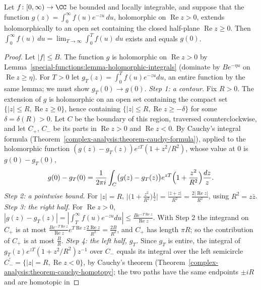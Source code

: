 \begin{theorem}\label{analytic-number-theory:theorem-newman}
Let $f \colon [0, \infty) \to \CC$ be bounded and locally integrable, and suppose that the function $g(z) = \int_0^\infty f(u)e^{-zu}\,du$, holomorphic on $\operatorname{Re}z > 0$, extends holomorphically
to an open set containing the closed half-plane $\operatorname{Re}z \geq 0$. Then $\int_0^\infty f(u)\,du = \lim_{T \to \infty}\int_0^Tf(u)\,du$ exists and equals $g(0)$.
\end{theorem}

\begin{proof}
Let $|f| \leq B$. The function $g$ is holomorphic on $\operatorname{Re}z > 0$ by Lemma~\ref{special-functions:lemma-holomorphic-integrals} (dominate by $Be^{-\eta u}$ on
$\operatorname{Re}z \geq \eta$). For $T > 0$ let $g_T(z) = \int_0^Tf(u)e^{-zu}du$, an entire function by the same lemma; we must show $g_T(0) \to g(0)$.
\emph{Step 1: a contour.} Fix $R > 0$. The extension of $g$ is holomorphic on an open set containing the compact set $\{|z| \leq R, \operatorname{Re}z \geq 0\}$, hence containing
$\{|z| \leq R, \operatorname{Re}z \geq -\delta\}$ for some $\delta = \delta(R) > 0$. Let $C$ be the boundary of this region, traversed counterclockwise, and let $C_+$, $C_-$ be its parts in
$\operatorname{Re}z > 0$ and $\operatorname{Re}z < 0$. By Cauchy's integral formula (Theorem~\ref{complex-analysis:theorem-cauchy-formula}), applied to the holomorphic function
$(g(z) - g_T(z))e^{zT}(1 + z^2/R^2)$, whose value at $0$ is $g(0) - g_T(0)$,
\[
g(0) - g_T(0) = \frac{1}{2\pi i}\int_C\bigl(g(z) - g_T(z)\bigr)e^{zT}\Bigl(1 + \frac{z^2}{R^2}\Bigr)\frac{dz}{z}.
\]
\emph{Step 2: a pointwise bound.} For $|z| = R$, $\bigl|\bigl(1 + \frac{z^2}{R^2}\bigr)\frac1z\bigr| = \frac{|\bar z + z|}{R^2} = \frac{2|\operatorname{Re}z|}{R^2}$, using $R^2 = z\bar z$.
\emph{Step 3: the right half.} For $\operatorname{Re}z > 0$, $|g(z) - g_T(z)| = |\int_T^\infty f(u)e^{-zu}du| \leq \frac{Be^{-T\operatorname{Re}z}}{\operatorname{Re}z}$. With Step 2 the integrand on $C_+$ is
at most $\frac{Be^{-T\operatorname{Re}z}}{\operatorname{Re}z}e^{T\operatorname{Re}z}\frac{2\operatorname{Re}z}{R^2} = \frac{2B}{R^2}$, and $C_+$ has length $\pi R$; so the contribution of $C_+$ is at most
$\frac{B}{R}$.
\emph{Step 4: the left half, $g_T$.} Since $g_T$ is entire, the integral of $g_T(z)e^{zT}(1 + z^2/R^2)z^{-1}$ over $C_-$ equals its integral over the left semicircle
$C_-^{\prime} = \{|z| = R, \operatorname{Re}z < 0\}$, by Cauchy's theorem (Theorem~\ref{complex-analysis:theorem-cauchy-homotopy}; the two paths have the same endpoints $\pm iR$ and are homotopic in

\end{proof}
